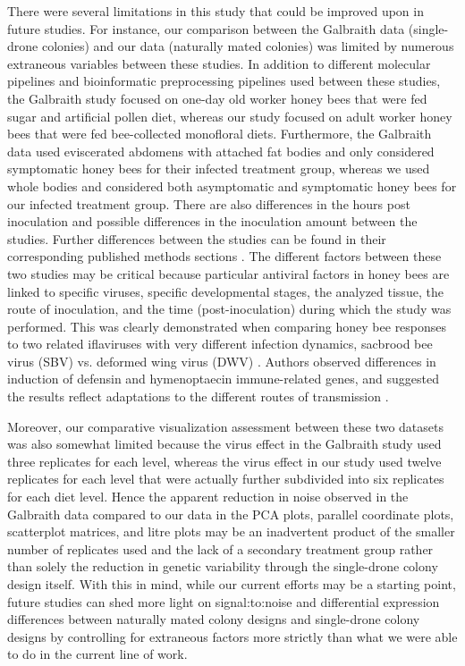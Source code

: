\documentclass{bmcart}
\begin{document}
\begin{linenumbers}
\begin{doublespacing}
There were several limitations in this study that could be improved upon in future studies. For instance, our comparison between the Galbraith data (single-drone colonies) and our data (naturally mated colonies) was limited by numerous extraneous variables between these studies. In addition to different molecular pipelines and bioinformatic preprocessing pipelines used between these studies, the Galbraith study focused on one-day old worker honey bees that were fed sugar and artificial pollen diet, whereas our study focused on adult worker honey bees that were fed bee-collected monofloral diets. Furthermore, the Galbraith data used eviscerated abdomens with attached fat bodies and only considered symptomatic honey bees for their infected treatment group, whereas we used whole bodies and considered both asymptomatic and symptomatic honey bees for our infected treatment group. There are also differences in the hours post inoculation and possible differences in the inoculation amount between the studies. Further differences between the studies can be found in their corresponding published methods sections \cite{adamInt, galbraith}. The different factors between these two studies may be critical because particular antiviral factors in honey bees are linked to specific viruses, specific developmental stages, the analyzed tissue, the route of inoculation, and the time (post-inoculation) during which the study was performed. This was clearly demonstrated when comparing honey bee responses to two related iflaviruses with very different infection dynamics, sacbrood bee virus (SBV) vs. deformed wing virus (DWV) \cite{Ryabov}. Authors observed differences in induction of defensin and hymenoptaecin immune-related genes, and suggested the results reflect adaptations to the different routes of transmission \cite{Ryabov}. 

Moreover, our comparative visualization assessment between these two datasets was also somewhat limited because the virus effect in the Galbraith study used three replicates for each level, whereas the virus effect in our study used twelve replicates for each level that were actually further subdivided into six replicates for each diet level. Hence the apparent reduction in noise observed in the Galbraith data compared to our data in the PCA plots, parallel coordinate plots, scatterplot matrices, and litre plots may be an inadvertent product of the smaller number of replicates used and the lack of a secondary treatment group rather than solely the reduction in genetic variability through the single-drone colony design itself. With this in mind, while our current efforts may be a starting point, future studies can shed more light on signal:to:noise and differential expression differences between naturally mated colony designs and single-drone colony designs by controlling for extraneous factors more strictly than what we were able to do in the current line of work. 


\end{doublespacing}
\end{linenumbers}
\end{document}
